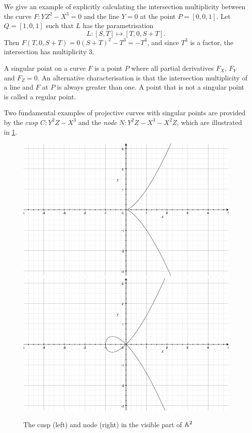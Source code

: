 We give an example of explicitly calculating the intersection multiplicity between the curve $F: YZ^2-X^3=0$ and the line $Y=0$ at the point $P = [0,0,1]$.
Let $Q = [1,0,1]$ such that $L$ has the parametrisation
$$L : [S,T] \mapsto [T,0,S+T].$$
Then $F(T,0,S+T) = 0 (S+T)^2 - T^3 = -T^3$, and since $T^3$ is a factor, the intersection has multiplicity 3.
\begin{definition}
	A singular point on a curve $F$ is a point $P$ where all partial derivatives $F_X$, $F_Y$ and $F_Z = 0$.
	An alternative characterisation is that the intersection multiplicity of a line and $F$ at $P$ is always greater than one.
	A point that is not a singular point is called a regular point.
\end{definition}
Two fundamental examples of projective curves with singular points are provided by the \emph{cusp} $C : Y^2Z - X^3$ and the \emph{node} $N : Y^2Z - X^3 - X^2Z$, which are illustrated in \cref{cuspandnode}.
\begin{figure}[htbp]
	\centering
	\includegraphics[scale=0.25]{../Figures/cusp.jpg}
	\includegraphics[scale=0.25]{../Figures/node.jpg}
	\caption{The cusp (left) and node (right) in the visible part of $\an[2]$}
	\label{cuspandnode}
\end{figure}
